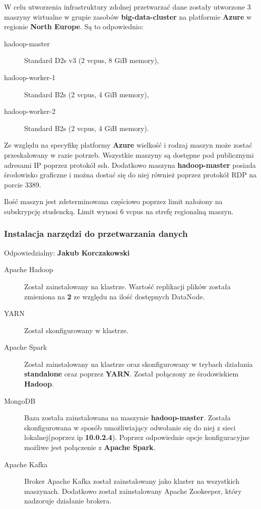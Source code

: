 \documentclass[a4paper,11pt, notitlepage ]{article}
\begin{document}
    W celu utworzenia infrastruktury zdolnej przetwarzać dane zostały utworzone 3 maszyny wirtualne w grupie zasobów \textbf{big-data-cluster
    } na platformie \textbf{Azure} w regionie \textbf{North Europe}. Są to odpowiednio:
    \begin{description}
        \item[hadoop-master] Standard D2s v3 (2 vcpus, 8 GiB memory),
        \item[hadoop-worker-1] Standard B2s (2 vcpus, 4 GiB memory),
        \item[hadoop-worker-2] Standard B2s (2 vcpus, 4 GiB memory). 
    \end{description}

    Ze względu na specyfikę platformy \textbf{Azure} wielkość i rodzaj maszyn może zostać przeskalowany w razie potrzeb. Wszystkie maszyny są dostępne pod publicznymi adresami IP poprzez protokół ssh. Dodatkowo maszyna \textbf{hadoop-master} posiada środowisko graficzne i można dostać się do niej również poprzez protokół RDP na porcie 3389.

    Ilość maszyn jest zdeterminowana częściowo poprzez limit nałożony na subskrypcję studencką. Limit wynosi 6 vcpus na strefę regionalną maszyn.

    \subsubsection{Instalacja narzędzi do przetwarzania danych}
    Odpowiedzialny: \textbf{Jakub Korczakowski}\\
    \begin{description}
        \item[Apache Hadoop] Został zainstalowany na klastrze. Wartość replikacji plików została zmieniona na \textbf{2} ze względu na ilość dostępnych DataNode.
        \item[YARN] Został skonfigurowany w klastrze.
        \item[Apache Spark]  Został zainstalowany na klastrze oraz skonfigurowany w trybach działania \textbf{standalone} oraz poprzez  \textbf{YARN}. Został połączony ze środowiskiem \textbf{Hadoop}.
        \item[MongoDB] Baza została zainstalowana na maszynie \textbf{hadoop-master}. Została skonfigurowana w sposób umożliwiający odwołanie się do niej z sieci lokalnej(poprzez ip \textbf{10.0.2.4}). Poprzez odpowiednie opcje konfiguracyjne możliwe jest połączenie z \textbf{Apache Spark}.
        \item[Apache Kafka] Broker Apache Kafka został zainstalowany jako klaster na wszystkich maszynach. Dodatkowo został zainstalowany Apache Zookeeper, który nadzoruje działanie brokera. 
    \end{description}   
    
\end{document}
